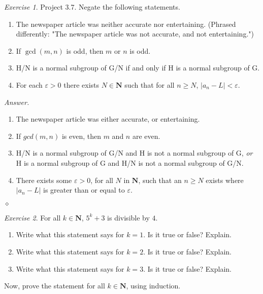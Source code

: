 \documentclass[12pt,oneside]{amsart}
\theoremstyle{remark}
\newtheorem{exer}{Exercise}
\newcommand{\bfN}{\mathbf{N}}
\newenvironment{answer}{\bigskip\noindent\emph{Answer.}}{\hfill$\diamond$\newline}
\begin{document}
%
%
%
%

\newpage
\begin{exer}
Project 3.7. Negate the following statements.
\begin{enumerate}[label={(\roman*)},start={4}]
\item The newspaper article was neither accurate nor entertaining. (Phrased differently: "The newspaper article was not accurate, and not entertaining.")
\item If $\gcd(m,n)$ is odd, then $m$ or $n$ is odd.
\item H/N is a normal subgroup of G/N if and only if H is a normal subgroup of G.
\item For each $\varepsilon > 0$ there exists $N \in \mathbf{N}$ such that
for all $n \geq N$, $|a_n-L| < \varepsilon$.
\end{enumerate}
\end{exer}

\begin{answer}
\begin{enumerate}[label={(\roman*)},start={4}]
\item The newspaper article was either accurate, or entertaining.
\item If $gcd(m, n)$ is even, then $m$ and $n$ are even.
\item H/N is a normal subgroup of G/N and H is not a normal subgroup of G, \emph{or} H is a normal subgroup of G and H/N is not a normal subgroup of G/N.
\item There exists some $\varepsilon > 0$, for all $N$ in $\bfN$, such that an $n \geq N$ exists where $|a_n - L|$ is greater than or equal to $\varepsilon$. \\

\end{enumerate}
\end{answer}

%
%
%
%

\newpage
\begin{exer}
For all $k \in \mathbf{N}$, $5^k + 3$ is divisible by $4$.
\begin{enumerate}
\item Write what this statement says for $k=1$. Is it true or false? Explain.
\item Write what this statement says for $k=2$. Is it true or false? Explain.
\item Write what this statement says for $k=3$. Is it true or false? Explain.
\end{enumerate}
Now, prove the statement for all $k \in \mathbf{N}$, using induction.
\end{exer}
\end{document}
